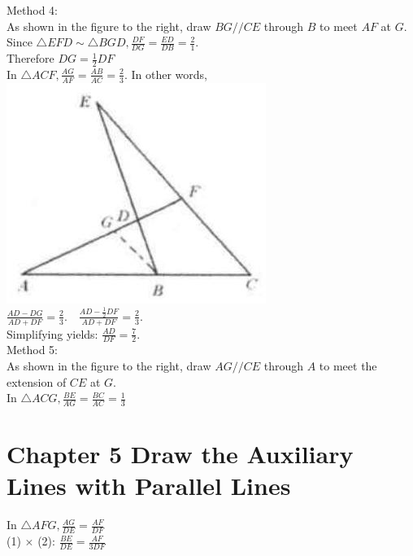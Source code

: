 \documentclass[10pt]{article}
\begin{document}
Method 4:\\
As shown in the figure to the right, draw \(B G / / C E\) through \(B\) to meet \(A F\) at \(G\).\\
Since \(\triangle E F D \sim \triangle B G D, \frac{D F}{D G}=\frac{E D}{D B}=\frac{2}{1}\).\\
Therefore \(D G=\frac{1}{2} D F\)\\
In \(\triangle A C F, \frac{A G}{A F}=\frac{A B}{A C}=\frac{2}{3}\). In other words,\\
\includegraphics[max width=\textwidth, center]{2025_04_17_97bc1f7e44d93c271a88g-112}\\
\(\frac{A D-D G}{A D+D F}=\frac{2}{3} . \quad \frac{A D-\frac{1}{2} D F}{A D+D F}=\frac{2}{3}\).\\
Simplifying yields: \(\frac{A D}{D F}=\frac{7}{2}\).\\
Method 5:\\
As shown in the figure to the right, draw \(A G / / C E\) through \(A\) to meet the extension of \(C E\) at \(G\).\\
In \(\triangle A C G, \frac{B E}{A G}=\frac{B C}{A C}=\frac{1}{3}\)

\section*{Chapter 5 Draw the Auxiliary Lines with Parallel Lines}
In \(\triangle A F G, \frac{A G}{D E}=\frac{A F}{D F}\)\\
(1) \(\times\) (2): \(\frac{B E}{D E}=\frac{A F}{3 D F}\)
\end{document}
